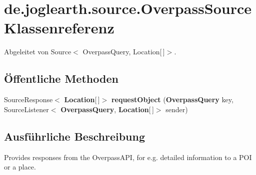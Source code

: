 \section{de.\-joglearth.\-source.\-Overpass\-Source \-Klassenreferenz}
\label{classde_1_1joglearth_1_1source_1_1_overpass_source}


\-Abgeleitet von \-Source$<$ Overpass\-Query, Location[$\,$]$>$.

\subsection*{Öffentliche \-Methoden}
\begin{DoxyCompactItemize}
\item 
\-Source\-Response$<$ {\bf \-Location}[$\,$]$>$ {\bfseries request\-Object} ({\bf \-Overpass\-Query} key, \-Source\-Listener$<$ {\bf \-Overpass\-Query}, {\bf \-Location}[$\,$]$>$ sender)\label{classde_1_1joglearth_1_1source_1_1_overpass_source_a931da21a0155bda26e3d0ac8fe8258b8}

\end{DoxyCompactItemize}


\subsection{\-Ausführliche \-Beschreibung}
\-Provides responses from the \-Overpass\-A\-P\-I, for e.\-g. detailed information to a \-P\-O\-I or a place. 